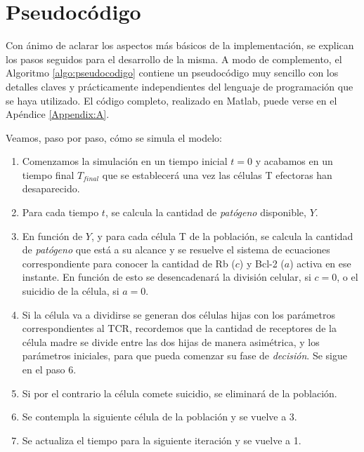 \section{Pseudocódigo}

Con ánimo de aclarar los aspectos más básicos de la implementación, se explican los pasos seguidos para el desarrollo de la misma. A modo de complemento, el Algoritmo \ref{algo:pseudocodigo} contiene un pseudocódigo muy sencillo con los detalles claves y prácticamente independientes del lenguaje de programación que se haya utilizado. El código completo, realizado en Matlab, puede verse en el Apéndice \ref{Appendix:A}.

Veamos, paso por paso, cómo se simula el modelo: 

\begin{enumerate}
	\item Comenzamos la simulación en un tiempo inicial $t=0$ y acabamos en un tiempo final $T_{final}$ que se establecerá una vez las células T efectoras han desaparecido. 
	
	\item Para cada tiempo $t$, se calcula la cantidad de \textit{patógeno} disponible, $Y$. 
	
	\item En función de $Y$, y para cada célula T de la población, se calcula la cantidad de \textit{patógeno} que está a su alcance y se resuelve el sistema de ecuaciones correspondiente para conocer la cantidad de Rb ($c$) y Bcl-2 ($a$) activa en ese instante. En función de esto se desencadenará la división celular, si $c = 0$, o el suicidio de la célula, si $a = 0$.
	
	\item Si la célula va a dividirse se generan dos células hijas con los parámetros correspondientes al TCR, recordemos que la cantidad de receptores de la célula madre se divide entre las dos hijas de manera asimétrica, y los parámetros iniciales, para que pueda comenzar su fase de \textit{decisión}. Se sigue en el paso 6.
	
	\item Si por el contrario la célula comete suicidio, se eliminará de la población. 

	\item Se contempla la siguiente célula de la población y se vuelve a 3.
	
	\item Se actualiza el tiempo para la siguiente iteración y se vuelve a 1.
\end{enumerate}


